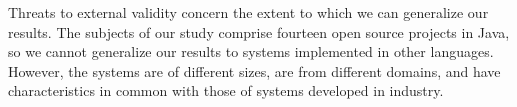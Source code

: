 Threats to external validity concern the extent to which we can generalize our results.
The subjects of our study comprise fourteen open source projects in Java,
so we cannot generalize our results to systems implemented in other languages.
However, the systems are of different sizes, are from different domains, and
have characteristics in common with those of systems developed in industry.

